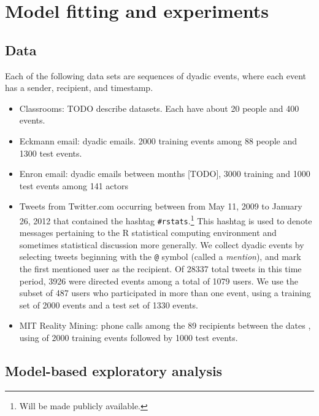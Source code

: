 \section{Model fitting and experiments}
\label{sec:experiments}

\subsection{Data}

Each of the following data sets are sequences of dyadic events, where each event has a sender, recipient, and timestamp.

\begin{itemize}
\item Classrooms: TODO describe datasets. Each have about 20 people and 400 events.  \cite{McFarland2001}
\item Eckmann email: dyadic emails.  2000 training events among 88 people and 1300 test events.  \cite{Eckmann2004}
\item Enron email: dyadic emails between months [TODO], 3000 training and 1000 test events among 141 actors \cite{Klimt2004}
\item Tweets from Twitter.com occurring between from May 11, 2009 to January 26, 2012 that contained the hashtag \texttt{\#rstats}.\footnote{Will be made publicly available.}  This hashtag is used to denote messages pertaining to the R statistical computing environment and sometimes statistical discussion more generally.  We collect dyadic events by selecting tweets beginning with the \texttt{@} symbol (called a \emph{mention}), and mark the first mentioned user as the recipient.
Of 28337 total tweets in this time period, 3926 were directed events among a total of 1079 users.
We use the subset of 487 users who participated in more than one event, using a training set of 2000 events and a test set of 1330 events.
\item MIT Reality Mining: phone calls among the 89 recipients between the dates , using of 2000 training events followed by 1000 test events. \cite{Eagle2009}
\end{itemize}

\subsection{Model-based exploratory analysis}

